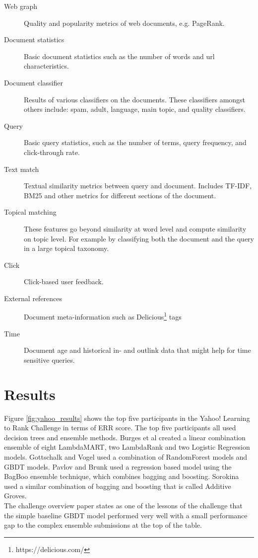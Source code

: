 \begin{description}
\item[Web graph]{Quality and popularity metrics of web documents, e.g. PageRank\cite{Page1999}}.
\item[Document statistics]{Basic document statistics such as the number of words and url characteristics.}
\item[Document classifier]{Results of various classifiers on the documents. These classifiers amongst others include: spam, adult, language, main topic, and quality classifiers.}
\item[Query]{Basic query statistics, such as the number of terms, query frequency, and click-through rate.}
\item[Text match]{Textual similarity metrics between query and document. Includes \ac{TF-IDF}, BM25\cite{Robertson2009} and other metrics for different sections of the document.}
\item[Topical matching]{These features go beyond similarity at word level and compute similarity on topic level. For example by classifying both the document and the query in a large topical taxonomy.}
\item[Click]{Click-based user feedback.}
\item[External references]{Document meta-information such as Delicious\footnote{https://delicious.com/} tags}
\item[Time]{Document age and historical in- and outlink data that might help for time sensitive queries.}
\end{description}

\section{Results}
Figure \ref{fig:yahoo_results} shows the top five participants in the Yahoo! Learning to Rank Challenge in terms of ERR score. The top five participants all used decision trees and ensemble methods. Burges et al\cite{Burges2011} created a linear combination ensemble of eight LambdaMART\cite{Burges2010}, two LambdaRank and two Logistic Regression models. Gottschalk and Vogel used a combination of RandomForest models and \ac{GBDT} models. Pavlov and Brunk used a regression based model using the BagBoo\cite{Pavlov2010} ensemble technique, which combines bagging and boosting. Sorokina used a similar combination of bagging and boosting that is called Additive Groves\cite{Sorokina2007}.\\

The challenge overview paper states as one of the lessons of the challenge that the simple baseline \ac{GBDT} model performed very well with a small performance gap to the complex ensemble submissions at the top of the table.

